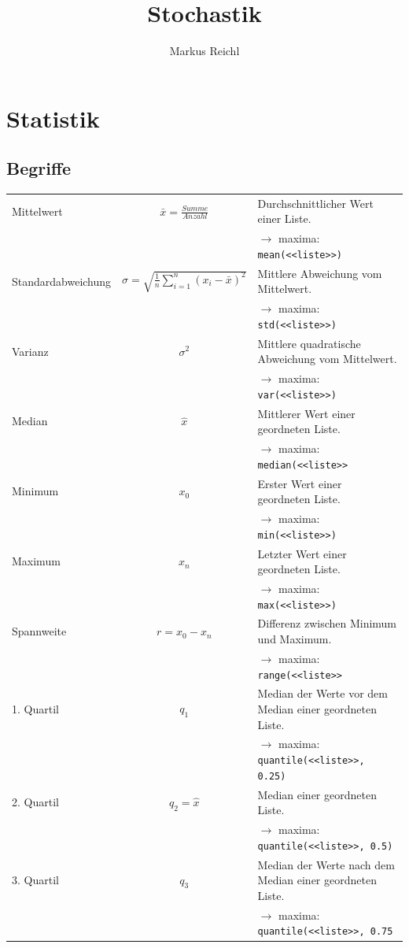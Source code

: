 \documentclass{school}
\title{Stochastik}
\author{Markus Reichl}
\begin{document}
\thispagestyle{fancy}


\newpage
\section{Statistik}
\subsection{Begriffe}
\begin{tabularx}{\textwidth}{X c l}
Mittelwert & $\bar{x} = \frac{Summe}{Anzahl}$ & \small{Durchschnittlicher Wert einer Liste.}\\
&& \footnotesize{$\to$ maxima: \verb|mean(<<liste>>)|}\\
Standardabweichung & $\sigma = \sqrt{\frac{1}{n} \sum_{i=1}^{n} (x_i - \bar{x})^2}$ & \small{Mittlere Abweichung vom Mittelwert.}\\
&& \footnotesize{$\to$ maxima: \verb|std(<<liste>>)|}\\
Varianz & $\sigma^2$ & \small{Mittlere quadratische Abweichung vom Mittelwert.}\\
&& \footnotesize{$\to$ maxima: \verb|var(<<liste>>)|}\\
Median & $\hat{x}$ & \small{Mittlerer Wert einer geordneten Liste.}\\
&& \footnotesize{$\to$ maxima: \verb|median(<<liste>>|}\\
Minimum & $x_0$ & \small{Erster Wert einer geordneten Liste.}\\
&& \footnotesize{$\to$ maxima: \verb|min(<<liste>>)|}\\
Maximum & $x_n$ & \small{Letzter Wert einer geordneten Liste.}\\
&& \footnotesize{$\to$ maxima: \verb|max(<<liste>>)|}\\
Spannweite & $r = x_0 - x_n$ & \small{Differenz zwischen Minimum und Maximum.}\\
&& \footnotesize{$\to$ maxima: \verb|range(<<liste>>|}\\
1. Quartil & $q_1$ & \small{Median der Werte vor dem Median einer geordneten Liste.}\\
&& \footnotesize{$\to$ maxima: \verb|quantile(<<liste>>, 0.25)|}\\
2. Quartil & $q_2 = \hat{x}$ & \small{Median einer geordneten Liste.}\\
&& \footnotesize{$\to$ maxima: \verb|quantile(<<liste>>, 0.5)|}\\
3. Quartil & $q_3$ & \small{Median der Werte nach dem Median einer geordneten Liste.}\\
&& \footnotesize{$\to$ maxima: \verb|quantile(<<liste>>, 0.75|}
\end{tabularx}
\end{document}
